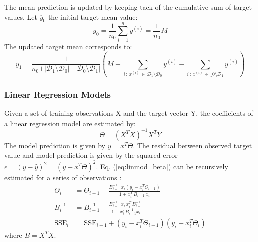 \documentclass[a4paper, 11pt]{article}
\begin{document}
The mean prediction is updated by keeping tack of the cumulative sum of target values. Let $\overline{y}_0$ the initial target mean value:
$$
\overline{y}_0 = \frac{1}{n_0} \sum_{i = 1}^n y^{(i)} = \frac{1}{n_0} M
$$
The updated target mean corresponds to:
$$
\overline{y}_1 =  \frac{1}{n_0 + \vert \mathcal{D}_1 \setminus \mathcal{D}_0 \vert - \vert \mathcal{D}_0 \setminus \mathcal{D}_1 \vert}\left(M + \sum_{i \,:\, x^{(i)} \, \in \, \mathcal{D}_1 \setminus \mathcal{D}_0} y^{(i)} - \sum_{i \,:\, x^{(i)} \, \in \, \_0 \setminus \mathcal{D}_1} y^{(i)} \right)
$$

\subsubsection{Linear Regression Models}

Given a set of training observations X and the target vector Y, the coefficients of a  linear regression model are estimated by:
\begin{equation}
\Theta = (X^TX)^{-1}X^TY
\label{eq:linmod_beta}
\end{equation}
The model prediction is given by $y = x^T \Theta$. The residual between observed target value and model prediction is given by the squared error $\epsilon = (y - \hat{y})^2 = (y - x^T \Theta)^2$. Eq. (\ref{eq:linmod_beta}) can be recursively estimated for a series of observations \cite{potts_incremental_model_tree}:
\begin{align*}
    \Theta_i &= \Theta_{i - 1} + \frac{B^{-1}_{i-1} \, x_i \left(y_i - x_i^T\Theta_{i-1}\right)}{1 + x_i^T \, B_{i-1} \, x_i} \\
    B^{-1}_i &= B^{-1}_{i-1} - \frac{B^{-1}_{i-1} \, x_i \, x_i^T \, B^{-1}_{i-1}}{1 + x_i^T B^{-1}_{i-1} x_i} \\
    \text{SSE}_i &= \text{SSE}_{i-1} + \left(y_i - x_i^T \Theta_{i-1}\right) \left(y_i - x_i^T \Theta_i\right)
\end{align*}
where $B = X^TX$.
\end{document}
